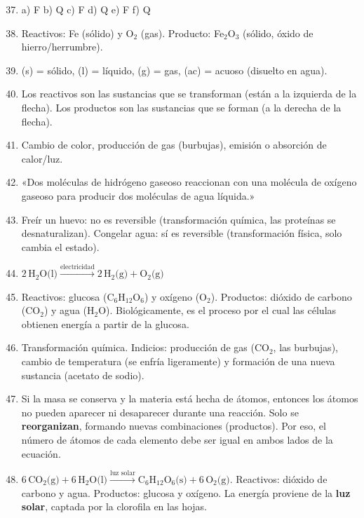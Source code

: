 \documentclass[12pt, letterpaper]{article}
\begin{document}
  \begin{enumerate}[leftmargin=*, label=\textbf{\arabic*.}]
    \setcounter{enumi}{36}
    \item a) F \quad b) Q \quad c) F \quad d) Q \quad e) F \quad f) Q

    \item Reactivos: Fe (sólido) y O$_2$ (gas). Producto: Fe$_2$O$_3$ (sólido, óxido de hierro/herrumbre).

    \item (s) = sólido, (l) = líquido, (g) = gas, (ac) = acuoso (disuelto en agua).

    \item Los reactivos son las sustancias que se transforman (están a la izquierda de la flecha). Los productos son las sustancias que se forman (a la derecha de la flecha).

    \item Cambio de color, producción de gas (burbujas), emisión o absorción de calor/luz.

    \item «Dos moléculas de hidrógeno gaseoso reaccionan con una molécula de oxígeno gaseoso para producir dos moléculas de agua líquida.»

    \item Freír un huevo: no es reversible (transformación química, las proteínas se desnaturalizan). Congelar agua: sí es reversible (transformación física, solo cambia el estado).

    \item $2\,\text{H}_2\text{O(l)} \xrightarrow{\text{electricidad}} 2\,\text{H}_2\text{(g)} + \text{O}_2\text{(g)}$

    \item Reactivos: glucosa (C$_6$H$_{12}$O$_6$) y oxígeno (O$_2$). Productos: dióxido de carbono (CO$_2$) y agua (H$_2$O). Biológicamente, es el proceso por el cual las células obtienen energía a partir de la glucosa.

    \item Transformación química. Indicios: producción de gas (CO$_2$, las burbujas), cambio de temperatura (se enfría ligeramente) y formación de una nueva sustancia (acetato de sodio).

    \item Si la masa se conserva y la materia está hecha de átomos, entonces los átomos no pueden aparecer ni desaparecer durante una reacción. Solo se \textbf{reorganizan}, formando nuevas combinaciones (productos). Por eso, el número de átomos de cada elemento debe ser igual en ambos lados de la ecuación.

    \item $6\,\text{CO}_2\text{(g)} + 6\,\text{H}_2\text{O(l)} \xrightarrow{\text{luz solar}} \text{C}_6\text{H}_{12}\text{O}_6\text{(s)} + 6\,\text{O}_2\text{(g)}$. Reactivos: dióxido de carbono y agua. Productos: glucosa y oxígeno. La energía proviene de la \textbf{luz solar}, captada por la clorofila en las hojas.
  \end{enumerate}

\fi
\end{document}
